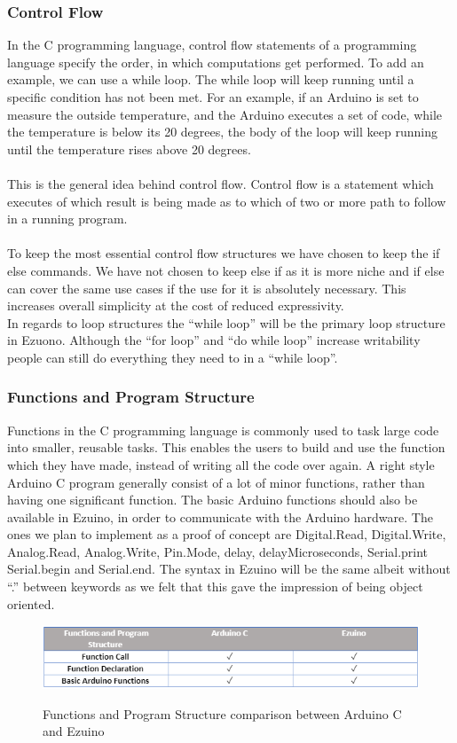 \subsubsection*{Control Flow}
In the C programming language, control flow statements of a programming language specify the order, in which computations get performed. To add an example, we can use a while loop. The while loop will keep running until a specific condition has not been met. For an example, if an Arduino is set to measure the outside temperature, and the Arduino executes a set of code, while the temperature is below its 20 degrees, the body of the loop will keep running until the temperature rises above 20 degrees. \\
\\
This is the general idea behind control flow. Control flow is a statement which executes of which result is being made as to which of two or more path to follow in a running program. \\
\\
To keep the most essential control flow structures we have chosen to keep the if else commands. We have not chosen to keep else if as it is more niche and if else can cover the same use cases if the use for it is absolutely necessary. This increases overall simplicity at the cost of reduced expressivity.
\\
In regards to loop structures the “while loop” will be the primary loop structure in Ezuono. Although the “for loop” and “do while loop” increase writability people can still do everything they need to in a “while loop”.


\subsubsection*{Functions and Program Structure}
Functions in the C programming language is commonly used to task large code into smaller, reusable tasks. This enables the users to build and use the function which they have made, instead of writing all the code over again. A right style Arduino C program generally consist of a lot of minor functions, rather than having one significant function.
The basic Arduino functions should also be available in Ezuino, in order to communicate with the Arduino hardware. The ones we plan to implement as a proof of concept are Digital.Read, Digital.Write, Analog.Read, Analog.Write, Pin.Mode, delay, delayMicroseconds, Serial.print Serial.begin and Serial.end. The syntax in Ezuino will be the same albeit without “.” between keywords as we felt that this gave the impression of being object oriented.
\begin{figure}[H]
\centering
\caption{Functions and Program Structure comparison between Arduino C and Ezuino}
\includegraphics[scale=0.80]{figures/language_features/langf10.png}
\label{lf10}
\end{figure}

